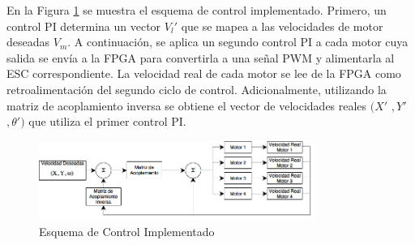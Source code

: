 \documentclass[twocolumn,10pt]{amrob}
\begin{document}
En la Figura \ref{fig:ctrl} se muestra el esquema de control implementado. Primero, un control PI determina un vector $V_l'$ que se mapea a las velocidades de motor deseadas $V_m$. 
A continuación, se aplica un segundo control PI a cada motor cuya  salida se envía a la FPGA para convertirla a una señal PWM  y alimentarla al ESC correspondiente. La velocidad real de cada motor se lee de la FPGA como retroalimentación del segundo ciclo de control. Adicionalmente, utilizando la matriz de acoplamiento inversa se obtiene el vector de velocidades reales $(X'$ $, Y'$ $, \theta')$ que utiliza el primer control PI.
\begin{figure}
  \centering
    \includegraphics[width=9cm]{ciclo_ctrl_avr.png}
  \caption{Esquema de Control Implementado}
  \label{fig:ctrl}
\end{figure}

\end{document}
